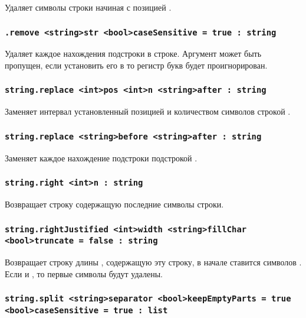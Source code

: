 \documentclass[a4paper, 14pt]{extarticle}
\begin{document}
Удаляет  символы строки начиная с позицией .

\subsubsection{\lstinline|.remove <string>str <bool>caseSensitive = true : string|}

Удаляет каждое нахождения подстроки  в строке. Аргумент  может быть пропущен, если установить его в \false{} то регистр букв будет проигнорирован.

\subsubsection{\lstinline|string.replace <int>pos <int>n <string>after : string|}

Заменяет интервал установленный позицией  и количеством символов  строкой .

\subsubsection{\lstinline|string.replace <string>before <string>after : string|}

Заменяет каждое нахождение подстроки  подстрокой .

\subsubsection{\lstinline|string.right <int>n : string|}

Возвращает строку содержащую последние  символы строки.

\subsubsection{\lstinline|string.rightJustified <int>width <string>fillChar <bool>truncate = false : string|}

Возвращает строку длины , содержащую эту строку, в начале ставится  символов . Если  и , то первые  символы будут удалены.

\subsubsection{\lstinline|string.split <string>separator <bool>keepEmptyParts = true <bool>caseSensitive = true : list|}
\end{document}
